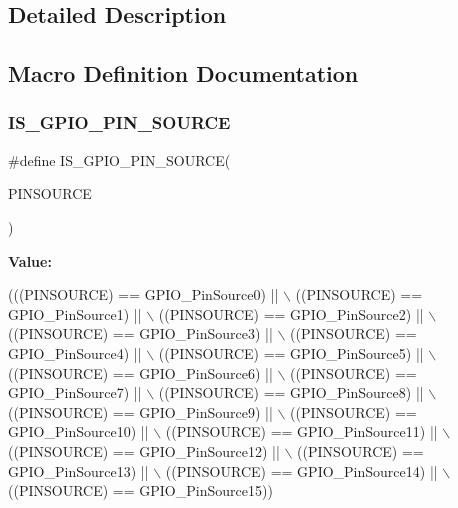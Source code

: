 \subsection{Detailed Description}


\subsection{Macro Definition Documentation}
\mbox{\label{group___g_p_i_o___pin__sources_ga689e4e72591136b6a8d4df9d895181f7}} 
\subsubsection{\texorpdfstring{I\+S\+\_\+\+G\+P\+I\+O\+\_\+\+P\+I\+N\+\_\+\+S\+O\+U\+R\+CE}{IS\_GPIO\_PIN\_SOURCE}}
{\footnotesize\ttfamily \#define I\+S\+\_\+\+G\+P\+I\+O\+\_\+\+P\+I\+N\+\_\+\+S\+O\+U\+R\+CE(\begin{DoxyParamCaption}\item[{}]{P\+I\+N\+S\+O\+U\+R\+CE }\end{DoxyParamCaption})}

{\bfseries Value\+:}
\begin{DoxyCode}
(((PINSOURCE) == GPIO\_PinSource0) || \(\backslash\)
                                       ((PINSOURCE) == GPIO\_PinSource1) || \(\backslash\)
                                       ((PINSOURCE) == GPIO\_PinSource2) || \(\backslash\)
                                       ((PINSOURCE) == GPIO\_PinSource3) || \(\backslash\)
                                       ((PINSOURCE) == GPIO\_PinSource4) || \(\backslash\)
                                       ((PINSOURCE) == GPIO\_PinSource5) || \(\backslash\)
                                       ((PINSOURCE) == GPIO\_PinSource6) || \(\backslash\)
                                       ((PINSOURCE) == GPIO\_PinSource7) || \(\backslash\)
                                       ((PINSOURCE) == GPIO\_PinSource8) || \(\backslash\)
                                       ((PINSOURCE) == GPIO\_PinSource9) || \(\backslash\)
                                       ((PINSOURCE) == GPIO\_PinSource10) || \(\backslash\)
                                       ((PINSOURCE) == GPIO\_PinSource11) || \(\backslash\)
                                       ((PINSOURCE) == GPIO\_PinSource12) || \(\backslash\)
                                       ((PINSOURCE) == GPIO\_PinSource13) || \(\backslash\)
                                       ((PINSOURCE) == GPIO\_PinSource14) || \(\backslash\)
                                       ((PINSOURCE) == GPIO\_PinSource15))
\end{DoxyCode}
